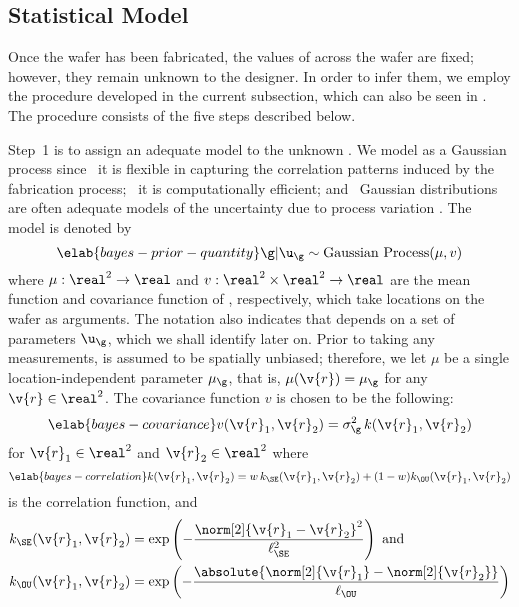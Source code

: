 \subsection{Statistical Model}

Once the wafer has been fabricated, the values of \g across the wafer are fixed;
however, they remain unknown to the designer. In order to infer them, we employ
the procedure developed in the current subsection, which can also be seen in
. The procedure consists of the five steps
described below.

Step~1 is to assign an adequate model to the unknown \g. We model \g as a
Gaussian process \cite{rasmussen2006} since \one~it is flexible in capturing the
correlation patterns induced by the fabrication process; \two~it is
computationally efficient; and \three~Gaussian distributions are often adequate
models of the uncertainty due to process variation \cite{reda2009,
srivastava2010, juan2012}. The model is denoted by
\begin{equation} \elab{bayes-prior-quantity}
  \g | \u_\g \sim \mathrm{Gaussian\ Process}(\mu, v)
\end{equation}
where $\mu: \real^2 \to \real$ and $v: \real^2 \times \real^2 \to \real$ are the
mean function and covariance function of \g, respectively, which take locations
on the wafer as arguments. The notation also indicates that \g depends on a set
of parameters $\u_\g$, which we shall identify later on. Prior to taking any
measurements, \g is assumed to be spatially unbiased; therefore, we let $\mu$ be
a single location-independent parameter $\mu_\g$, that is, $\mu(\v{r}) = \mu_\g$
for any $\v{r} \in \real^2$. The covariance function $v$ is chosen to be the
following:
\begin{equation} \elab{bayes-covariance}
  v(\v{r}_1, \v{r}_2) = \sigma_\g^2 \, k(\v{r}_1, \v{r}_2)
\end{equation}
for $\v{r}_1 \in \real^2$ and $\v{r}_2 \in \real^2$ where
\begin{equation} \elab{bayes-correlation}
  k(\v{r}_1, \v{r}_2) = w \, k_\SE(\v{r}_1, \v{r}_2) + (1 - w) k_\OU(\v{r}_1, \v{r}_2)
\end{equation}
is the correlation function, and
\begin{align*}
  k_\SE(\v{r}_1, \v{r}_2) & = \exp\left(-\frac{\norm[2]{\v{r}_1 - \v{r}_2}^2}{\ell_\SE^2}\right) \text{ and} \\
  k_\OU(\v{r}_1, \v{r}_2) & = \exp\left(-\frac{\absolute{\norm[2]{\v{r}_1} - \norm[2]{\v{r}_2}}}{\ell_\OU}\right)
\end{align*}

